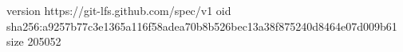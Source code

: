 version https://git-lfs.github.com/spec/v1
oid sha256:a9257b77c3e1365a116f58adea70b8b526bec13a38f875240d8464e07d009b61
size 205052
